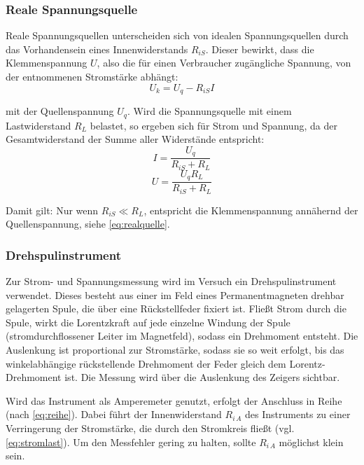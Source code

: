 \subsubsection{Reale Spannungsquelle}
Reale Spannungsquellen unterscheiden sich von idealen Spannungsquellen durch das Vorhandensein eines Innenwiderstands \(R_{iS}\). Dieser bewirkt, dass die Klemmenspannung \(U\), also die für einen Verbraucher zugängliche Spannung, von der entnommenen Stromstärke abhängt:
\begin{equation}
    U_k = U_q - R_{iS} I
    \label{eq:realquelle}
\end{equation}

mit der Quellenspannung \(U_q\). Wird die Spannungsquelle mit einem Lastwiderstand \(R_L\) belastet, so ergeben sich für Strom und Spannung, da der Gesamtwiderstand der Summe aller Widerstände entspricht:
\begin{equation}
    I = \frac{U_q}{R_{iS} + R_L}
    \label{eq:stromlast}
\end{equation}
\begin{equation}
    U = \frac{U_q R_L}{R_{iS} + R_L}
    \label{eq:spannunglast}
\end{equation}

Damit gilt: Nur wenn \(R_{iS} \ll R_L\), entspricht die Klemmenspannung annähernd der Quellenspannung, siehe \cref{eq:realquelle}.

\subsubsection{Drehspulinstrument}
Zur Strom- und Spannungsmessung wird im Versuch ein Drehspulinstrument verwendet. Dieses besteht aus einer im Feld eines Permanentmagneten drehbar gelagerten Spule, die über eine Rückstellfeder fixiert ist. Fließt Strom durch die Spule, wirkt die Lorentzkraft auf jede einzelne Windung der Spule (stromdurchflossener Leiter im Magnetfeld), sodass ein Drehmoment entsteht. Die Auslenkung ist proportional zur Stromstärke, sodass sie so weit erfolgt, bis das winkelabhängige rückstellende Drehmoment der Feder gleich dem Lorentz-Drehmoment ist. Die Messung wird über die Auslenkung des Zeigers sichtbar.

Wird das Instrument als Amperemeter genutzt, erfolgt der Anschluss in Reihe (nach \cref{eq:reihe}). Dabei führt der Innenwiderstand \(R_{i\,A}\) des Instruments zu einer Verringerung der Stromstärke, die durch den Stromkreis fließt (vgl. \cref{eq:stromlast}). Um den Messfehler gering zu halten, sollte \(R_{i\,A}\) möglichst klein sein.

